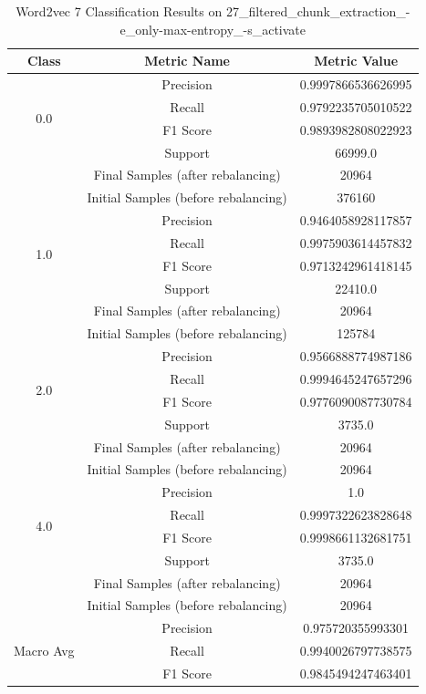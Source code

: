 \begin{longtable}{|c|c|c|}
\caption{Word2vec 7 Classification Results on 27\_filtered\_chunk\_extraction\_-e\_only-max-entropy\_-s\_activate} \label{tab:27_filtered_chunk_extraction_-e_only-max-entropy_-s_activate_word2vec_7_classifiers_results} \\
\hline
Class & Metric Name & Metric Value \\
\hline
\multirow{4}{*}{0.0} & Precision & 0.9997866536626995 \\
 & Recall & 0.9792235705010522 \\
 & F1 Score & 0.9893982808022923 \\
 & Support & 66999.0 \\
 & Final Samples (after rebalancing) & 20964 \\
 & Initial Samples (before rebalancing) & 376160 \\
\hline
\multirow{4}{*}{1.0} & Precision & 0.9464058928117857 \\
 & Recall & 0.9975903614457832 \\
 & F1 Score & 0.9713242961418145 \\
 & Support & 22410.0 \\
 & Final Samples (after rebalancing) & 20964 \\
 & Initial Samples (before rebalancing) & 125784 \\
\hline
\multirow{4}{*}{2.0} & Precision & 0.9566888774987186 \\
 & Recall & 0.9994645247657296 \\
 & F1 Score & 0.9776090087730784 \\
 & Support & 3735.0 \\
 & Final Samples (after rebalancing) & 20964 \\
 & Initial Samples (before rebalancing) & 20964 \\
\hline
\multirow{4}{*}{4.0} & Precision & 1.0 \\
 & Recall & 0.9997322623828648 \\
 & F1 Score & 0.9998661132681751 \\
 & Support & 3735.0 \\
 & Final Samples (after rebalancing) & 20964 \\
 & Initial Samples (before rebalancing) & 20964 \\
\hline
\multirow{4}{*}{Macro Avg} & Precision & 0.975720355993301 \\
 & Recall & 0.9940026797738575 \\
 & F1 Score & 0.9845494247463401 \\

\end{longtable}
